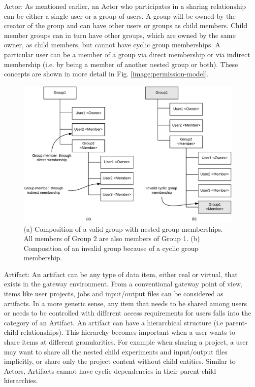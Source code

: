 \documentclass[sigconf]{acmart}
\begin{document}
Actor: As mentioned earlier, an Actor who participates in a sharing relationship can be either a single user or a group of users. A group will be owned by the creator of the group and can have other users or groups as child members. Child member groups can in turn have other groups, which are owned by the same owner, as child members, but cannot have cyclic group memberships. A particular user can be a member of a group via direct membership or via indirect membership (i.e. by being a member of another nested group or both). These concepts are shown in more detail in Fig. \ref{image:permission-model}.

\begin{figure}
\includegraphics[width=\columnwidth]{figures/group-composition.pdf}
\caption{(a) Composition of a valid group with nested group memberships. All members of Group 2 are also members of Group 1. (b) Composition of an invalid group because of a cyclic group membership.}
\end{figure}

Artifact: An artifact can be any type of data item, either real or virtual, that exists in the gateway environment. From a conventional gateway point of view, items like user projects, jobs and input/output files can be considered as artifacts. In a more generic sense, any item that needs to be shared among users or needs to be controlled with different access requirements for users falls into the category of an Artifact. An artifact can have a hierarchical structure (i.e parent-child relationships). This hierarchy becomes important when a user wants to share items at different granularities. For example when sharing a project, a user may want to share all the nested child experiments and input/output files implicitly, or share only the project content without child entities. Similar to Actors, Artifacts cannot have cyclic dependencies in their parent-child hierarchies.
\end{document}
